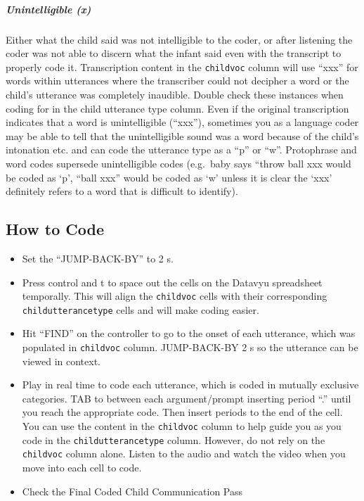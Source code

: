 \documentclass[
]{book}
\providecommand{\tightlist}{%
  \setlength{\itemsep}{0pt}\setlength{\parskip}{0pt}}
\begin{document}
\hypertarget{unintelligible_child}{%
\subparagraph*{Unintelligible (x)}\label{unintelligible_child}}

Either what the child said was not intelligible to the coder, or after listening the coder was not able to discern what the infant said even with the transcript to properly code it. Transcription content in the \texttt{childvoc} column will use ``xxx'' for words within utterances where the transcriber could not decipher a word or the child's utterance was completely inaudible. Double check these instances when coding for in the child utterance type column. Even if the original transcription indicates that a word is unintelligible (``xxx''), sometimes you as a language coder may be able to tell that the unintelligible sound was a word because of the child's intonation etc. and can code the utterance type as a ``p'' or ``w''.
Protophrase and word codes supersede unintelligible codes (e.g.~baby says ``throw ball xxx would be coded as `p', ``ball xxx'' would be coded as `w' unless it is clear the `xxx' definitely refers to a word that is difficult to identify).

\hypertarget{how-to-code}{%
\subsection*{How to Code}\label{how-to-code}}

\begin{itemize}
\tightlist
\item
  Set the ``JUMP-BACK-BY'' to 2 s.
\item
  Press control and t to space out the cells on the Datavyu spreadsheet temporally. This will align the \texttt{childvoc} cells with their corresponding \texttt{childutterancetype} cells and will make coding easier.
\item
  Hit ``FIND'' on the controller to go to the onset of each utterance, which was populated in \texttt{childvoc} column. JUMP-BACK-BY 2 s so the utterance can be viewed in context.
\item
  Play in real time to code each utterance, which is coded in mutually exclusive categories. TAB to between each argument/prompt inserting period ``.'' until you reach the appropriate code. Then insert periods to the end of the cell.
  You can use the content in the \texttt{childvoc} column to help guide you as you code in the \texttt{childutterancetype} column. However, do not rely on the \texttt{childvoc} column alone. Listen to the audio and watch the video when you move into each cell to code.
\item
  Check the Final Coded Child Communication Pass
\end{itemize}
\end{document}
